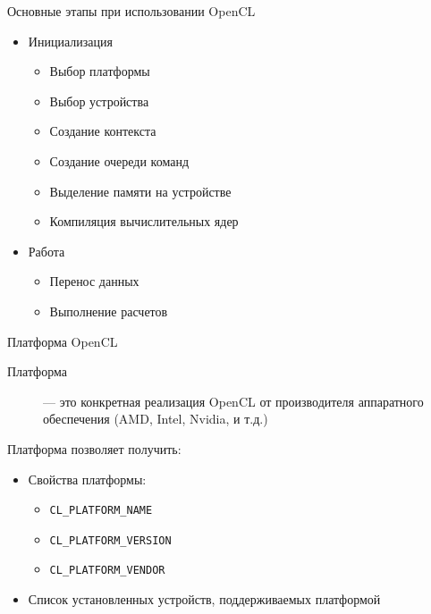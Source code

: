 \documentclass[@BEAMER_OPTIONS@]{beamer}
\newcommand{\code}[1]{\lstinline|#1|}
\begin{document}
\begin{frame}{Основные этапы при использовании OpenCL}
    \begin{itemize}
        \item Инициализация
            \begin{itemize}
                \item Выбор платформы
                \item Выбор устройства
                \item Создание контекста
                \item Создание очереди команд
                \item Выделение памяти на устройстве
                \item Компиляция вычислительных ядер
            \end{itemize}
        \item Работа
            \begin{itemize}
                \item Перенос данных
                \item Выполнение расчетов
            \end{itemize}
    \end{itemize}
\end{frame}

\begin{frame}[fragile]{Платформа OpenCL}
    \begin{description}
        \item[Платформа] --- это конкретная реализация OpenCL от производителя
            аппаратного обеспечения (AMD, Intel, Nvidia, и т.д.)
    \end{description}

    Платформа позволяет получить:
    \begin{itemize}
        \item Свойства платформы:
            \begin{itemize}
                \item \code{CL_PLATFORM_NAME}
                \item \code{CL_PLATFORM_VERSION}
                \item \code{CL_PLATFORM_VENDOR}
            \end{itemize}
        \item Список установленных устройств, поддерживаемых платформой
    \end{itemize}
\end{frame}
\end{document}
